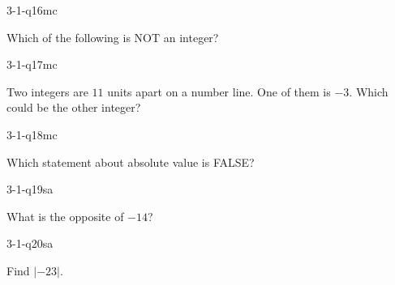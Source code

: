 \begin{practiceQuestion}{3-1-q16}{mc}
\begin{questionText}
Which of the following is NOT an integer?
\end{questionText}
\end{practiceQuestion}

\begin{practiceQuestion}{3-1-q17}{mc}
\begin{questionText}
Two integers are $11$ units apart on a number line. One of them is $-3$. Which could be the other integer?
\end{questionText}
\end{practiceQuestion}

\begin{practiceQuestion}{3-1-q18}{mc}
\begin{questionText}
Which statement about absolute value is FALSE?
\end{questionText}
\end{practiceQuestion}


\begin{practiceQuestion}{3-1-q19}{sa}
\begin{questionText}
What is the opposite of $-14$?
\end{questionText}
\end{practiceQuestion}

\begin{practiceQuestion}{3-1-q20}{sa}
\begin{questionText}
Find $|{-23}|$.
\end{questionText}
\end{practiceQuestion}

